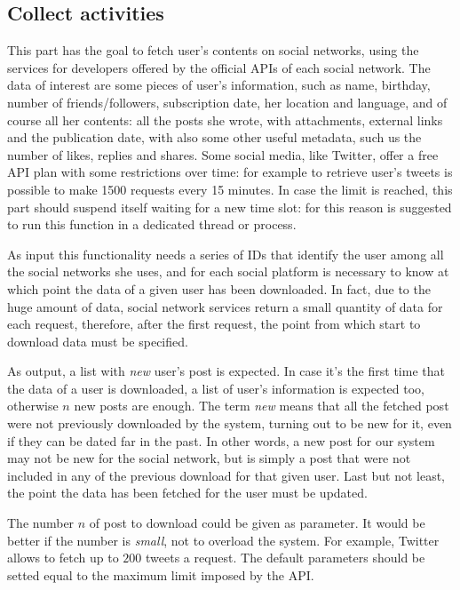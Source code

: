 \subsection{Collect activities}
This part has the goal to fetch user's contents on social networks, using the services for developers offered by the official APIs of each social network. The data of interest are some pieces of user's information, such as name, birthday, number of friends/followers, subscription date, her location and language, and of course all her contents: all the posts she wrote, with attachments, external links and the publication date, with also some other useful metadata, such us the number of likes, replies and shares. Some social media, like Twitter, offer a free API plan with some restrictions over time: for example to retrieve user's tweets is possible to make 1500 requests every 15 minutes. In case the limit is reached, this part should suspend itself waiting for a new time slot: for this reason is suggested to run this function in a dedicated thread or process.

As input this functionality needs a series of IDs that identify the user among all the social networks she uses, and for each social platform is necessary to know at which point the data of a given user has been downloaded. In fact, due to the huge amount of data, social network services return a small quantity of data for each request, therefore, after the first request, the point from which start to download data must be specified.

As output, a list with \emph{new} user's post is expected. In case it's the first time that the data of a user is downloaded, a list of user's information is expected too, otherwise $ n $ new posts are enough. The term \emph{new} means that all the fetched post were not previously downloaded by the system, turning out to be new for it, even if they can be dated far in the past. In other words, a new post for our system may not be new for the social network, but is simply a post that were not included in any of the previous download for that given user. Last but not least, the point the data has been fetched for the user must be updated.

The number $ n $ of post to download could be given as parameter. It would be better if the number is \emph{small}, not to overload the system. For example, Twitter allows to fetch up to $ 200 $ tweets a request. The default parameters should be setted equal to the maximum limit imposed by the API.

